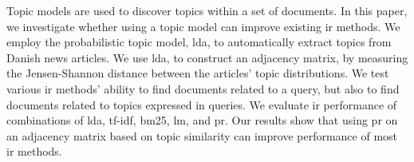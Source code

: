Topic models are used to discover topics within a set of documents.
In this paper, we investigate whether using a topic model can improve existing \acrlong{ir} methods.
We employ the probabilistic topic model, \acrlong{lda}, to automatically extract topics from Danish news articles.
We use \acrlong{lda}, to construct an adjacency matrix, by measuring the Jensen-Shannon distance between the articles' topic distributions.
We test various \acrlong{ir} methods' ability to find documents related to a query, but also to find documents related to topics expressed in queries.
We evaluate \acrlong{ir} performance of combinations of \acrlong{lda}, \acrlong{tf-idf}, \acrlong{bm25}, \acrlong{lm}, and \acrlong{pr}.
Our results show that using \acrlong{pr} on an adjacency matrix based on topic similarity can improve performance of most \acrlong{ir} methods.
